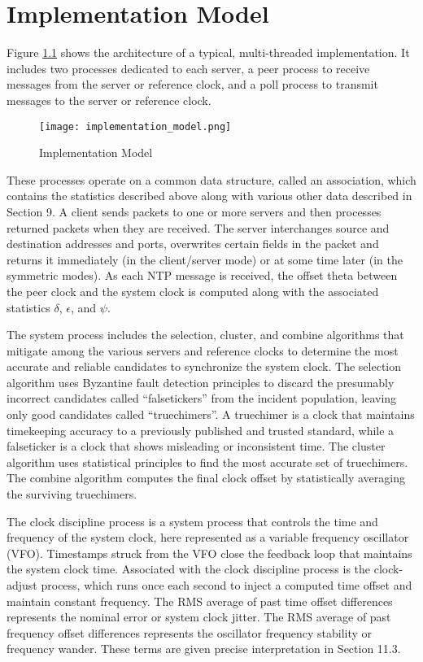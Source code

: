 \chapter{Implementation Model}

Figure \ref{implementation_model} shows the architecture of a typical, multi-threaded
implementation. It includes two processes dedicated to each server,
a peer process to receive messages from the server or reference
clock, and a poll process to transmit messages to the server or
reference clock.

\begin{figure}
\centering
\texttt{[image: implementation\_model.png]}
\caption{Implementation Model}
\label{implementation_model}
\end{figure}

These processes operate on a common data structure, called an
association, which contains the statistics described above along with
various other data described in Section 9. A client sends packets to
one or more servers and then processes returned packets when they are
received. The server interchanges source and destination addresses
and ports, overwrites certain fields in the packet and returns it
immediately (in the client/server mode) or at some time later (in the
symmetric modes). As each NTP message is received, the offset theta
between the peer clock and the system clock is computed along with
the associated statistics $ \delta $, $ \epsilon $, and $ \psi $.

The system process includes the selection, cluster, and combine
algorithms that mitigate among the various servers and reference
clocks to determine the most accurate and reliable candidates to
synchronize the system clock. The selection algorithm uses Byzantine
fault detection principles to discard the presumably incorrect
candidates called ``falsetickers'' from the incident population,
leaving only good candidates called ``truechimers''. A truechimer is a
clock that maintains timekeeping accuracy to a previously published
and trusted standard, while a falseticker is a clock that shows
misleading or inconsistent time. The cluster algorithm uses
statistical principles to find the most accurate set of truechimers.
The combine algorithm computes the final clock offset by
statistically averaging the surviving truechimers.

The clock discipline process is a system process that controls the
time and frequency of the system clock, here represented as a
variable frequency oscillator (VFO). Timestamps struck from the VFO
close the feedback loop that maintains the system clock time.
Associated with the clock discipline process is the clock-adjust
process, which runs once each second to inject a computed time offset
and maintain constant frequency. The RMS average of past time offset
differences represents the nominal error or system clock jitter. The
RMS average of past frequency offset differences represents the
oscillator frequency stability or frequency wander. These terms are
given precise interpretation in Section 11.3.

